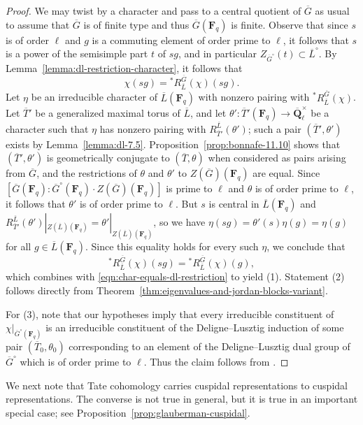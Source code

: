 \documentclass[reqno]{amsart}
\numberwithin{equation}{subsection}
\newcommand{\F}{\mathbf{F}}
\newcommand{\Q}{\mathbf{Q}}
\newcommand{\ol}[1]{\overline{#1}}
\newcommand{\co}{\colon}
\theoremstyle{remark}
\numberwithin{equation}{subsection}
\numberwithin{figure}{subsection}
\begin{document}
\begin{proof}
    We may twist by a character and pass to a central quotient of $\ol G$ as usual to assume that $\ol G$ is of finite type and thus $\ol G(\F_q)$ is finite. Observe that since $s$ is of order $\ell$ and $g$ is a commuting element of order prime to $\ell$, it follows that $s$ is a power of the semisimple part $t$ of $sg$, and in particular $Z_{\ol G^\circ}(t) \subset \ol L^\circ$. By Lemma~\ref{lemma:dl-restriction-character}, it follows that
    \begin{equation}\label{eqn:char-equals-dl-restriction}
    \chi(sg) = {}^*R^{\ol G}_{\ol L}(\chi)(sg).
    \end{equation}
    Let $\eta$ be an irreducible character of $\ol L(\F_q)$ with nonzero pairing with ${}^*R^{\ol G}_{\ol L}(\chi)$. Let $\ol T'$ be a generalized maximal torus of $\ol L$, and let $\theta'\co \ol T'(\F_q) \to \ol\Q_\ell^\times$ be a character such that $\eta$ has nonzero pairing with $R_{\ol T'}^{\ol L}(\theta')$; such a pair $(\ol T', \theta')$ exists by Lemma~\ref{lemma:dl-7.5}. Proposition~\ref{prop:bonnafe-11.10} shows that $(\ol T', \theta')$ is geometrically conjugate to $(\ol T, \theta)$ when considered as pairs arising from $\ol G$, and the restrictions of $\theta$ and $\theta'$ to $Z(\ol G)(\F_q)$ are equal. Since $[\ol G(\F_q): \ol G^\circ(\F_q) \cdot Z(\ol G)(\F_q)]$ is prime to $\ell$ and $\theta$ is of order prime to $\ell$, it follows that $\theta'$ is of order prime to $\ell$. But $s$ is central in $\ol L(\F_q)$ and $R_{\ol T'}^{\ol L}(\theta')|_{Z(\ol L)(\F_q)} = \theta'|_{Z(\ol L)(\F_q)}$, so we have $\eta(sg) = \theta'(s)\eta(g) = \eta(g)$ for all $g \in \ol L(\F_q)$. Since this equality holds for every such $\eta$, we conclude that
    \[
    {}^*R^{\ol G}_{\ol L}(\chi)(sg) = {}^*R^{\ol G}_{\ol L}(\chi)(g),
    \]
    which combines with \eqref{eqn:char-equals-dl-restriction} to yield (1). Statement (2) follows directly from Theorem~\ref{thm:eigenvalues-and-jordan-blocks-variant}.

    For (3), note that our hypotheses imply that every irreducible constituent of $\chi|_{\ol G^\circ(\F_q)}$ is an irreducible constituent of the Deligne--Lusztig induction of some pair $(\ol T_0, \theta_0)$ corresponding to an element of the Deligne--Lusztig dual group of $\ol G^\circ$ which is of order prime to $\ell$. Thus the claim follows from \cite[Theorem~1.7]{CE99}.
\end{proof}



We next note that Tate cohomology carries cuspidal representations to cuspidal representations. The converse is not true in general, but it is true in an important special case; see Proposition~\ref{prop:glauberman-cuspidal}.
\end{document}
